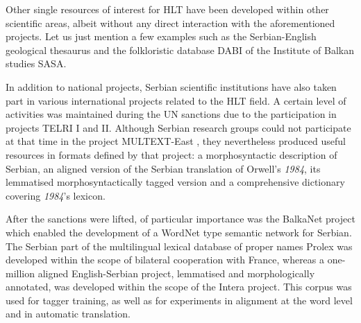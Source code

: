 \begin{multicols}{2}
Other single resources of interest for HLT have been developed within other scientific areas, albeit without any direct interaction with the aforementioned projects. Let us just mention a few examples such as the Serbian-English geological thesaurus \cite{RGF} and the folkloristic database DABI of the Institute of Balkan studies SASA. \cite{BALKANINSTITUT} 

In addition to national projects, Serbian scientific institutions have also taken part in various international projects related to the HLT field. A certain level of activities was maintained during the UN sanctions due to the participation in projects TELRI I and II. \cite{TELRI} Although Serbian research groups could not participate at that time in the project MULTEXT-East \cite{NL}, they nevertheless produced useful resources in formats defined by that project: a morphosyntactic description of Serbian, an aligned version of the Serbian translation of Orwell’s \textit{1984}, its lemmatised morphosyntactically tagged version and a comprehensive dictionary covering \textit{1984}'s lexicon. 

\vspace{0.5cm}

After the sanctions were lifted, of particular importance was the BalkaNet \cite{CORDIS} project which enabled the development of a WordNet type semantic network for Serbian. The Serbian part of the multilingual lexical database of proper names Prolex \cite{CNRTL} was developed within the scope of bilateral cooperation with France, whereas a one-million aligned English-Serbian project, lemmatised and morphologically annotated, was developed within the scope of the Intera project.  This corpus was used for tagger training, as well as for experiments in alignment at the word level and in automatic translation.
 

\end{multicols}
